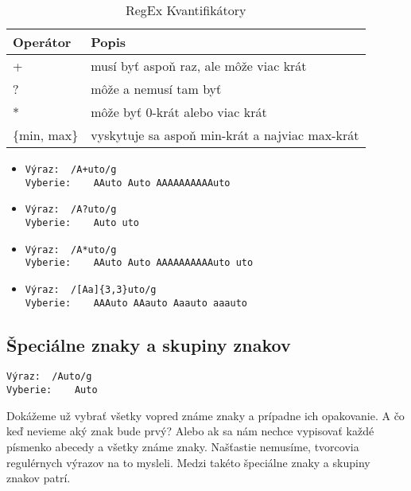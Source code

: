 \documentclass[10pt,twoside,slovak,a4paper]{article}
\begin{document}
\begin{table}
\centering
\begin{tabular}{|l|l|} 
\hline
\textbf{Operátor} & \textbf{Popis}                                  \\ 
\hline
+                 & musí byť aspoň raz, ale môže viac krát          \\ 
\hline
?                 & môže a nemusí tam byť                           \\ 
\hline
*                 & môže byť 0-krát alebo viac krát                 \\ 
\hline
\{min, max\}      & vyskytuje sa aspoň min-krát a najviac max-krát  \\
\hline
\end{tabular}
\caption{RegEx Kvantifikátory}
\end{table}

\begin{itemize}
\item
\begin{verbatim}
Výraz:	/A+uto/g
Vyberie:	AAuto Auto AAAAAAAAAAuto
\end{verbatim}
\item
\begin{verbatim}
Výraz:	/A?uto/g
Vyberie:	Auto uto
\end{verbatim}
\item
\begin{verbatim}
Výraz:	/A*uto/g
Vyberie:	AAuto Auto AAAAAAAAAAuto uto
\end{verbatim}
\item
\begin{verbatim}
Výraz:	/[Aa]{3,3}uto/g
Vyberie:	AAAuto AAauto Aaauto aaauto
\end{verbatim}
\end{itemize}

\subsection{Špeciálne znaky a skupiny znakov}
\begin{verbatim}
Výraz:	/Auto/g
Vyberie:	Auto
\end{verbatim}

Dokážeme už vybrať všetky vopred známe znaky a prípadne ich opakovanie. A čo keď nevieme aký znak bude prvý? Alebo ak sa nám nechce vypisovať každé písmenko abecedy a všetky známe znaky. Našťastie nemusíme, tvorcovia regulérnych výrazov na to mysleli.
Medzi takéto špeciálne znaky a skupiny znakov patrí.
\end{document}
